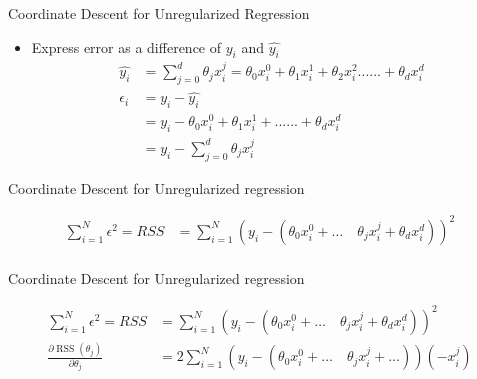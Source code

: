 \documentclass{beamer}
\begin{document}
{

}


\begin{frame}{Coordinate Descent for Unregularized Regression}

\begin{itemize}[<+->]
	
	
	
	
	
	\item Express error as a difference of $y_{i}$ and $\hat{y_{i}}$
	\begin{align}
	\hat{y_i} &= \sum_{j=0}^{d} \theta_{j}x^{j}_{i} = \theta_{0}x_{i}^{0} + \theta_{1}x_{i}^{1} +\theta_{2}x_{i}^{2} ...... + \theta_{d}x_{i}^{d}  \\
	\epsilon_{i} &= y_{i} - \hat{y_{i}}\\
	&= y_{i} - \theta_{0}x_{i}^{0} + \theta_{1}x_{i}^{1} + ...... + \theta_{d}x_{i}^{d}\\
	&= y_{i} - \sum_{j=0}^{d} \theta_{j}x_{i}^{j}
	\end{align}
	
	
	
\end{itemize}


\end{frame}



\begin{frame}{Coordinate Descent for Unregularized regression}

\begin{align*}
\sum_{i=1}^{N}  \epsilon^{2}=RSS &=\sum_{i=1}^{N}\left(y_{i}-\left(\theta_{0}x_{i}^{0}+\ldots \quad \theta_{j} x_{i}^{j}+\theta_{d} x_{i}^{d}\right)\right)^{2}\\
\end{align*}
\end{frame}

\begin{frame}{Coordinate Descent for Unregularized regression}

\begin{align*}
\sum_{i=1}^{N}  \epsilon^{2}=RSS &=\sum_{i=1}^{N}\left(y_{i}-\left(\theta_{0}x_{i}^{0}+\ldots \quad \theta_{j} x_{i}^{j}+\theta_{d} x_{i}^{d}\right)\right)^{2}\\
\frac{\partial \operatorname{RSS}\left(\theta_{j}\right)}{\partial \theta_{j}}&= 2 \sum_{i=1}^{N}\left(y_{i}-\left(\theta_{0}x_{i}^{0}+\ldots \quad \theta_{j} x_{i}^{j}+\ldots \right)\right)\left(-x_{i}^{j}\right)\\
\end{align*}
\end{frame}
\end{document}
